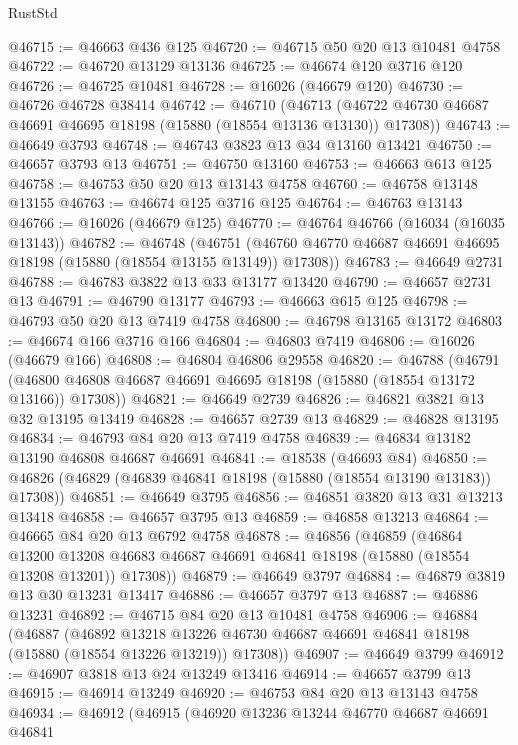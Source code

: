 \begin{lexlean}{RustStd}
\begin{coremodule}
@46715 := @46663 @436 @125
@46720 := @46715 @50 @20 @13 @10481 @4758
@46722 := @46720 @13129 @13136
@46725 := @46674 @120 @3716 @120
@46726 := @46725 @10481
@46728 := @16026 (@46679 @120)
@46730 := @46726 @46728 @38414
@46742 := @46710
    (@46713 (@46722 @46730 @46687 @46691 @46695 @18198 (@15880 (@18554 @13136 @13130)) @17308))
@46743 := @46649 @3793
@46748 := @46743 @3823 @13 @34 @13160 @13421
@46750 := @46657 @3793 @13
@46751 := @46750 @13160
@46753 := @46663 @613 @125
@46758 := @46753 @50 @20 @13 @13143 @4758
@46760 := @46758 @13148 @13155
@46763 := @46674 @125 @3716 @125
@46764 := @46763 @13143
@46766 := @16026 (@46679 @125)
@46770 := @46764 @46766 (@16034 (@16035 @13143))
@46782 := @46748
    (@46751 (@46760 @46770 @46687 @46691 @46695 @18198 (@15880 (@18554 @13155 @13149)) @17308))
@46783 := @46649 @2731
@46788 := @46783 @3822 @13 @33 @13177 @13420
@46790 := @46657 @2731 @13
@46791 := @46790 @13177
@46793 := @46663 @615 @125
@46798 := @46793 @50 @20 @13 @7419 @4758
@46800 := @46798 @13165 @13172
@46803 := @46674 @166 @3716 @166
@46804 := @46803 @7419
@46806 := @16026 (@46679 @166)
@46808 := @46804 @46806 @29558
@46820 := @46788
    (@46791 (@46800 @46808 @46687 @46691 @46695 @18198 (@15880 (@18554 @13172 @13166)) @17308))
@46821 := @46649 @2739
@46826 := @46821 @3821 @13 @32 @13195 @13419
@46828 := @46657 @2739 @13
@46829 := @46828 @13195
@46834 := @46793 @84 @20 @13 @7419 @4758
@46839 := @46834 @13182 @13190 @46808 @46687 @46691
@46841 := @18538 (@46693 @84)
@46850 := @46826 (@46829 (@46839 @46841 @18198 (@15880 (@18554 @13190 @13183)) @17308))
@46851 := @46649 @3795
@46856 := @46851 @3820 @13 @31 @13213 @13418
@46858 := @46657 @3795 @13
@46859 := @46858 @13213
@46864 := @46665 @84 @20 @13 @6792 @4758
@46878 := @46856
    (@46859
      (@46864
        @13200
        @13208
        @46683
        @46687
        @46691
        @46841
        @18198
        (@15880 (@18554 @13208 @13201))
        @17308))
@46879 := @46649 @3797
@46884 := @46879 @3819 @13 @30 @13231 @13417
@46886 := @46657 @3797 @13
@46887 := @46886 @13231
@46892 := @46715 @84 @20 @13 @10481 @4758
@46906 := @46884
    (@46887
      (@46892
        @13218
        @13226
        @46730
        @46687
        @46691
        @46841
        @18198
        (@15880 (@18554 @13226 @13219))
        @17308))
@46907 := @46649 @3799
@46912 := @46907 @3818 @13 @24 @13249 @13416
@46914 := @46657 @3799 @13
@46915 := @46914 @13249
@46920 := @46753 @84 @20 @13 @13143 @4758
@46934 := @46912
    (@46915
      (@46920
        @13236
        @13244
        @46770
        @46687
        @46691
        @46841

\end{coremodule}
\end{lexlean}
